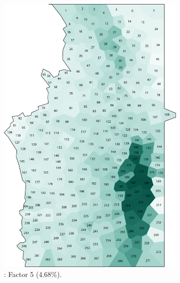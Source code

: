 \documentclass[output=paper]{LSP/langsci}
\begin{document}
\begin{figure}
\begin{subfigure}[t]{0.3\textwidth}
\includegraphics[width=\textwidth]{illustrations/pickl_fig6}
\caption{: Factor 5 (4.68\%).}
\label{fig:pickl:6}
\end{subfigure}   
~
\begin{subfigure}[t]{0.3\textwidth}

\end{subfigure}
\end{figure}
\end{document}
